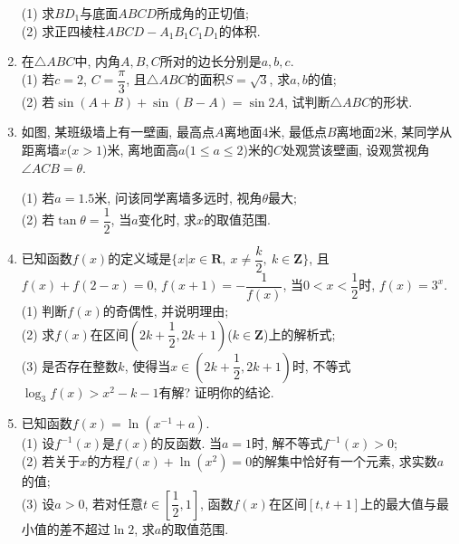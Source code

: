 \documentclass[10pt,a4paper]{article}
\begin{document}
\begin{enumerate}[1.]
\begin{center}
\end{center}
(1) 求$BD_1$与底面$ABCD$所成角的正切值;\\
(2) 求正四棱柱$ABCD-A_1B_1C_1D_1$的体积.
\item 在$\triangle ABC$中, 内角$A,B,C$所对的边长分别是$a,b,c$.\\
(1) 若$c=2$, $C=\dfrac{\pi }3$, 且$\triangle ABC$的面积$S=\sqrt 3$, 求$a,b$的值;\\
(2) 若$\sin (A+B)+\sin (B-A)=\sin 2A$, 试判断$\triangle ABC$的形状.
\item 如图, 某班级墙上有一壁画, 最高点$A$离地面$4$米, 最低点$B$离地面$2$米, 某同学从距离墙$x$($x>1$)米, 离地面高$a$($1\le a\le 2$)米的$C$处观赏该壁画, 设观赏视角$\angle ACB=\theta$.
\begin{center}
\end{center}
(1) 若$a=1.5$米, 问该同学离墙多远时, 视角$\theta$最大;\\
(2) 若$\tan \theta =\dfrac 12$, 当$a$变化时, 求$x$的取值范围.
\item 已知函数$f(x)$的定义域是$\{x|x\in \mathbf{R},\ x\ne \dfrac k2, \ k\in \mathbf{Z}\}$, 且$f(x)+f(2-x)=0$, $f(x+1)=-\dfrac 1{f(x)}$, 当$0<x<\dfrac 12$时, $f(x)=3^x$.\\
(1) 判断$f(x)$的奇偶性, 并说明理由;\\
(2) 求$f(x)$在区间$(2k+\dfrac 12,2k+1)$($k\in \mathbf{Z}$)上的解析式;\\
(3) 是否存在整数$k$, 使得当$x\in (2k+\dfrac 12,2k+1)$时, 不等式$\log_3f(x)>x^2-k-1$有解? 证明你的结论.
\item 已知函数$f(x)=\ln (x^{-1}+a)$.\\
(1) 设$f^{-1}(x)$是$f(x)$的反函数. 当$a=1$时, 解不等式$f^{-1}(x)>0$;\\
(2) 若关于$x$的方程$f(x)+\ln (x^2)=0$的解集中恰好有一个元素, 求实数$a$的值;\\
(3) 设$a>0$, 若对任意$t\in [\dfrac 12,1]$, 函数$f(x)$在区间$[t,t+1]$上的最大值与最小值的差不超过$\ln 2$, 求$a$的取值范围.


\end{enumerate}
\end{document}

